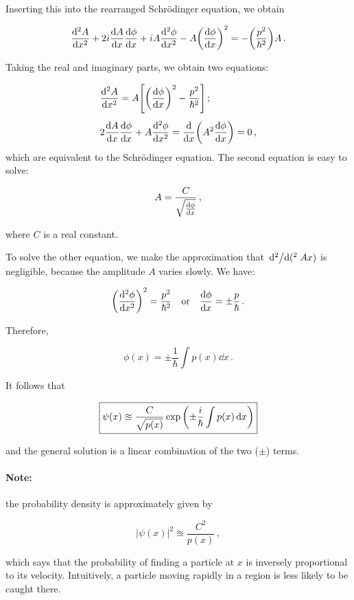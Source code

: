 \documentclass[12pt, titlepage]{article}
\begin{document}
Inserting this into the rearranged Schrödinger equation, we obtain

\begin{equation}
	\dv[2]{A}{x} + 2i\dv{A}{x}\dv{\phi}{x} + iA\dv[2]{\phi}{x} - A\qty(\dv{\phi}{x})^2 = -\qty(\frac{p^2}{\hbar^2})A \,.
\end{equation}

Taking the real and imaginary parts, we obtain two equations:

\begin{subequations}
\begin{align}
	&\dv[2]{A}{x} = A\qty[\qty(\dv{\phi}{x})^2 - \frac{p^2}{\hbar^2}]\,; \\[4pt]
	&2\dv{A}{x}\dv{\phi}{x} + A\dv[2]{\phi}{x} = \dv{x}\qty(A^2\dv{\phi}{x}) = 0\,,
\end{align}
\end{subequations}
which are equivalent to the Schrödinger equation. The second equation is easy to solve:

\begin{equation}
	A = \frac{C}{\sqrt{\dv{\phi}{x}}} \,,
\end{equation}

where $C$ is a real constant.

To solve the other equation, we make the approximation that $\dv*[2](A{x})$ is negligible, because the amplitude $A$ varies slowly. We have:

\begin{equation}
	\qty(\dv[2]{\phi}{x})^2 = \frac{p^2}{\hbar^2} \quad\text{or}\quad \dv{\phi}{x} = \pm\frac{p}{\hbar} \,.
\end{equation}

Therefore, 

\begin{equation}
	\phi(x) = \pm \frac{1}{\hbar}\int p(x)\dd{x}\,.
\end{equation}

It follows that

\begin{equation}
	\boxed{ \psi(x) \approxeq \frac{C}{\sqrt{p(x)}}\exp\qty(\pm\frac{i}{\hbar}\int p(x)\dd{x}) }
\end{equation}

and the general solution is a linear combination of the two ($\pm$) terms.

\begin{mdframed}
\paragraph*{Note:} the probability density is approximately given by

\begin{equation}
	|\psi(x)|^2 \approxeq \frac{C^2}{p(x)} \,,
\end{equation}

which says that the probability of finding a particle at $x$ is inversely proportional to its velocity. Intuitively, a particle moving rapidly in a region is less likely to be caught there.
\end{mdframed}
\end{document}
